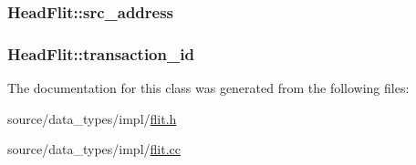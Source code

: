 \hypertarget{classHeadFlit_d7e8fd576ead55e392185a75da63aca1}{
\subsubsection[{src\_\-address}]{ {\bf HeadFlit::src\_\-address}}}
\label{classHeadFlit_d7e8fd576ead55e392185a75da63aca1}


\hypertarget{classHeadFlit_4dd44bd07942e1eeace24cae293beb5a}{
\subsubsection[{transaction\_\-id}]{ {\bf HeadFlit::transaction\_\-id}}}
\label{classHeadFlit_4dd44bd07942e1eeace24cae293beb5a}




The documentation for this class was generated from the following files:\begin{CompactItemize}
\item 
source/data\_\-types/impl/\hyperlink{flit_8h}{flit.h}\item 
source/data\_\-types/impl/\hyperlink{flit_8cc}{flit.cc}\end{CompactItemize}
